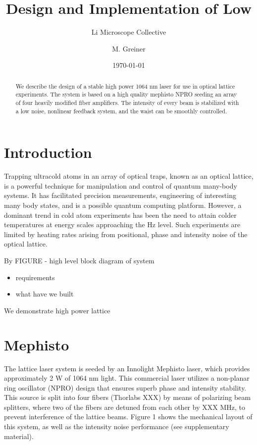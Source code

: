 \documentclass[twocolumn,aps,pra,showpacs,preprintnumbers,bibnotes]{revtex4-1}
\begin{document}
\title{Design and Implementation of Low }


\author{Li Microscope Collective}
\author{M. Greiner}

\date{\today}
\begin{abstract}
We describe the design of a stable high power 1064 nm laser for use in optical lattice experiments. The system is based on a high quality mephisto NPRO seeding an array of four heavily modified fiber amplifiers. The intensity of every beam is stabilized with a low noise, nonlinear feedback system, and the waist can be smoothly controlled. 
\end{abstract}
\maketitle
\section{Introduction}
Trapping ultracold atoms in an array of optical traps, known as an optical lattice, is a powerful technique for manipulation and control of quantum many-body systems. 
It has facilitated precision measurements, engineering of interesting many body states, and is a possible quantum computing platform.
However, a dominant trend in cold atom experiments has been the need to attain colder temperatures at energy scales approaching the Hz level.
Such experiments are limited by heating rates arising from positional, phase and intensity noise of the optical lattice. 

By FIGURE - high level block diagram of system

\begin{itemize}
	\item requirements 
	\item what have we built
\end{itemize}

We demonstrate high power lattice 


\section{Mephisto}
The lattice laser system is seeded by an Innolight Mephisto laser, which provides approximately 2 W of 1064 nm light. 
This commercial laser utilizes a non-planar ring oscillator (NPRO) design that ensures superb phase and intensity stability. This source is split into four fibers (Thorlabs XXX) by means of polarizing beam splitters, where two of the fibers are detuned from each other by XXX MHz, to prevent interference of the lattice beams. Figure 1 shows the mechanical layout of this system, as well as the intensity noise performance (see supplementary material).
\end{document}
